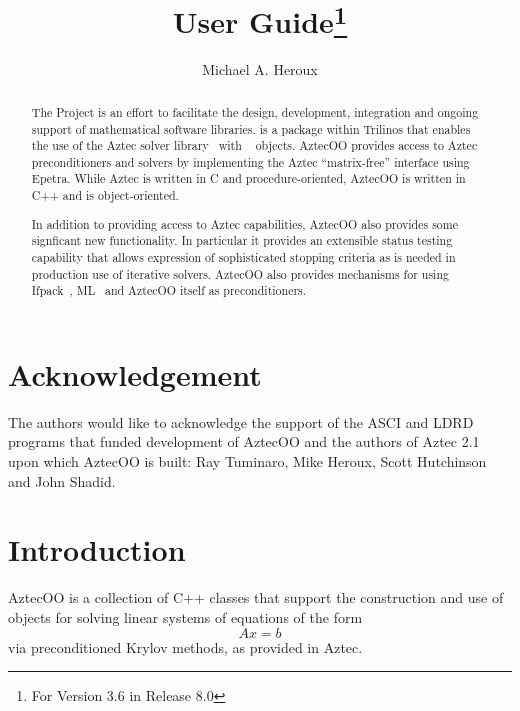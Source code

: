 \documentclass[12pt,relax]{AztecOOUserGuide}
\title{\AztecOOTM{} User Guide\footnote{For \AztecOOTM{} Version 3.6 in \TrilinosTM{} Release
8.0}}
\author{Michael A. Heroux}
\date{} %
\begin{document}
\maketitle

\begin{abstract}

The \TrilinosTM{} Project is an effort to facilitate the design, development,
integration and ongoing support of mathematical software libraries.
\AztecOOTM{} is a package within Trilinos that enables the use of the Aztec solver
library~\cite{Aztec2.1} with \EpetraTM{}~\cite{Epetra-home-page} objects.
AztecOO provides access to Aztec preconditioners and solvers by
implementing the Aztec ``matrix-free'' interface using Epetra.
While Aztec is written in C and procedure-oriented,
AztecOO is written in C++ and is object-oriented.

In addition to providing access to Aztec capabilities, AztecOO also
provides some signficant new functionality.  In particular it provides
an extensible status testing capability that allows expression of
sophisticated stopping criteria as is needed in production use of
iterative solvers.  AztecOO also provides mechanisms for using
Ifpack~\cite{Ifpack-home-page}, ML~\cite{ML-home-page} and AztecOO
itself as preconditioners.
\end{abstract}


\section*{Acknowledgement}
The authors would like to acknowledge the support of the ASCI and LDRD
programs that funded development of AztecOO and the authors of Aztec
2.1 upon which AztecOO is built: Ray Tuminaro, Mike Heroux, Scott
Hutchinson and John Shadid.

\clearpage
\tableofcontents
\listoffigures

\clearpage

\section{Introduction}
\label{Section:Introduction}

AztecOO is a collection of C++ classes that support the construction
and use of objects for solving linear systems of equations of the form
\begin{equation}
\label{e:axb}
Ax = b
\end{equation}
via
preconditioned Krylov methods, as provided in Aztec.
\end{document}
